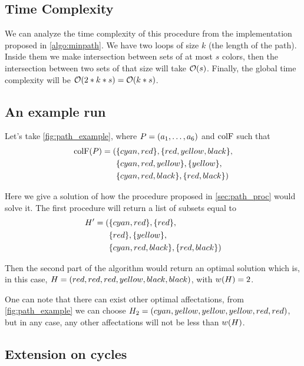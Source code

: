 \subsection{Time Complexity}

We can analyze the time complexity of this procedure from the implementation proposed in \cref{algo:minpath}. We have two loops of size $k$ (the length of the path). Inside them we make intersection between sets of at most $s$ colors, then the intersection between two sets of that size will take $\mathcal{O}(s)$. Finally, the global time complexity will be $\mathcal{O}(2 * k * s) = \mathcal{O}(k*s)$.

\subsection{An example run}
\label{sec:path_ex_run}



Let's take \cref{fig:path_example}, where $P = (a_1,\ldots,a_{6})$ and $\text{colF}$ such that
\begin{align*}
  \text{colF}(P) = ( & \{cyan,red\}, \{red,yellow,black\},    \\
                   & \{cyan,red,yellow\}, \{yellow\},    \\
                   & \{cyan,red,black\}, \{red,black\}   )
\end{align*}

Here we give a solution of how the procedure proposed in \cref{sec:path_proc} would solve it. The first procedure will return a list of subsets equal to
\begin{align*}
  H' = ( & \{cyan,red\}, \{red\},      \\
               & \{red\}, \{yellow\},        \\
               & \{cyan,red,black\}, \{red,black\}   )
\end{align*}

Then the second part of the algorithm would return an optimal solution which is, in this case, $H = (red, red, red, yellow, black, black)$, with $w(H) = 2$.

One can note that there can exist other optimal affectations, from \cref{fig:path_example} we can choose $H_2 = (cyan, yellow, yellow, yellow, red, red)$, but in any case, any other affectations will not be less than  $w(H)$.

\subsection{Extension on cycles}

